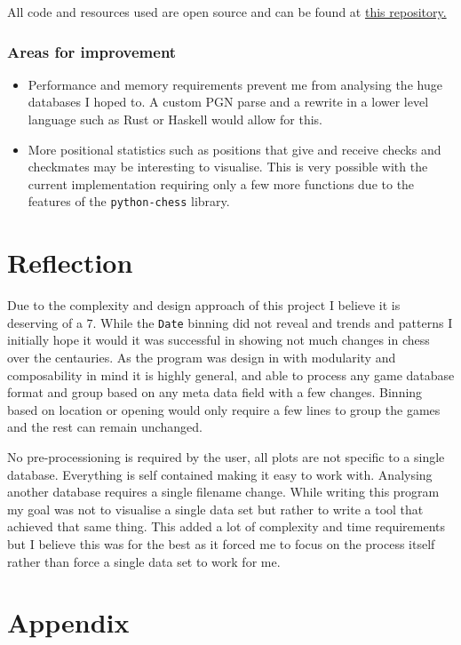 \documentclass[11pt]{article}
\begin{document}
All code and resources used are open source and can be found at \href{https://github.com/Jake-Moss/chess-analysis}{this repository.}
\subsubsection{Areas for improvement}
\label{sec:orgb03cf5b}
\begin{itemize}
\item Performance and memory requirements prevent me from analysing the huge databases I hoped to. A custom PGN parse and a rewrite in a lower level language such as Rust or Haskell would allow for this.
\item More positional statistics such as positions that give and receive checks and checkmates may be interesting to visualise. This is very possible with the current implementation requiring only a few more functions due to the features of the \texttt{python-chess} library.
\end{itemize}
\section{Reflection}
\label{sec:org5a406ec}
Due to the complexity and design approach of this project I believe it is deserving of a \(7\). While the \texttt{Date} binning did not reveal and trends and patterns I initially hope it would it was successful in showing not much changes in chess over the centauries.
As the program was design in with modularity and composability in mind it is highly general, and able to process any game database format and group based on any meta data field with a few changes. Binning based on location or opening would only require a few lines to group the games and the rest can remain unchanged.

No pre-processioning is required by the user, all plots are not specific to a single database. Everything is self contained making it easy to work with. Analysing another database requires a single filename change.
While writing this program my goal was not to visualise a single data set but rather to write a tool that achieved that same thing. This added a lot of complexity and time requirements but I believe this was for the best as it forced me to focus on the process itself rather than force a single data set to work for me.
\newpage



\section{Appendix}
\label{sec:org4712c24}
\end{document}
